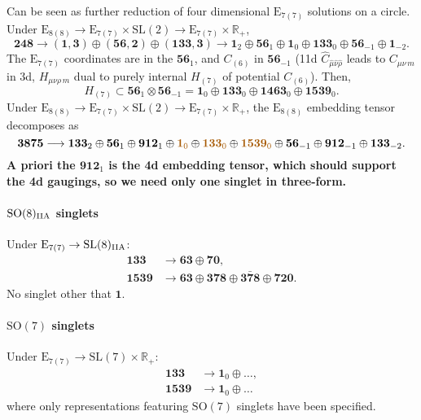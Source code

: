 \documentclass[11pt]{article}
\newcommand{\SO}{\ensuremath{\mathrm{SO}}\xspace}
\newcommand{\SL}{\ensuremath{\mathrm{SL}}\xspace}
\newcommand{\E}{\ensuremath{\mathrm{E}}\xspace}
\newcommand{\R}{\ensuremath{\mathbb{R}}\xspace}
\newcommand{\ce}[1]{\marginpar{\parbox{\marginparwidth}{\boldmath $\Longleftarrow$}}
{\boldmath\bfseries #1}}
\begin{document}
Can be seen as further reduction of four dimensional $\E_{7(7)}$ solutions on a circle. Under $\E_{8(8)}\rightarrow\E_{7(7)}\times\SL(2)\rightarrow\E_{7(7)}\times\R_{+}$,
\begin{equation}
  \bm{248} \longrightarrow (\bm{1},\bm{3}) \oplus (\bm{56},\bm{2}) \oplus (\bm{133},\bm{3})\longrightarrow \bm{1}_{2} \oplus \bm{56}_{1} \oplus \bm{1}_{0} \oplus \bm{133}_{0} \oplus \bm{56}_{-1} \oplus \bm{1}_{-2}.
\end{equation}
The $\E_{7(7)}$ coordinates are in the $\bm{56}_{1}$, and $C_{(6)}$ in $\bm{56}_{-1}$ (11d $\hat{C}_{\hat\mu\hat\nu\hat\rho}$ leads to $C_{\mu\nu\,m}$ in 3d, $H_{\mu\nu\rho\,m}$ dual to purely internal $H_{(7)}$ of potential $C_{(6)}$). Then,
\begin{equation}
    H_{(7)} \subset \bm{56}_{1} \otimes \bm{56}_{-1} = \bm{1}_{0} \oplus \bm{133}_{0} \oplus \bm{1463}_{0} \oplus \bm{1539}_{0}.
\end{equation}
Under $\E_{8(8)}\rightarrow\E_{7(7)}\times\SL(2)\rightarrow\E_{7(7)}\times\R_{+}$, the $\E_{8(8)}$ embedding tensor decomposes as
\begin{equation}
    \bm{3875} \longrightarrow \bm{133}_{2} \oplus \bm{56}_{1} \oplus \bm{912}_{1} \oplus {\color{mydarkorange}\bm{1}_{0}} \oplus {\color{mydarkorange}\bm{133}_{0}} \oplus {\color{mydarkorange}\bm{1539}_{0}} \oplus \bm{56}_{-1} \oplus \bm{912}_{-1} \oplus \bm{133}_{-2}.
\end{equation}
\ce{A priori the $\bm{912}_{1}$ is the 4d embedding tensor, which should support the 4d gaugings, so we need only one singlet in three-form.}

\paragraph{\boldmath $\SO(8)_{\rm IIA}$ singlets}
Under $\E_{7(7)}\rightarrow\SL(8)_{\rm IIA}$:
\begin{equation}
  \begin{aligned}
    \bm{133} & \longrightarrow \bm{63} \oplus \bm{70},\\
    \bm{1539} & \longrightarrow \bm{63} \oplus \bm{378} \oplus \bm{\bar{378}} \oplus \bm{720}.
  \end{aligned}
\end{equation}
No singlet other that $\bm{1}$.

\paragraph{\boldmath $\SO(7)$ singlets}
Under $\E_{7(7)}\rightarrow\SL(7)\times\R_{+}$:
\begin{equation}
  \begin{aligned}
    \bm{133} & \longrightarrow \bm{1}_{0} \oplus \ldots,\\
    \bm{1539} & \longrightarrow \bm{1}_{0} \oplus \ldots
  \end{aligned}
\end{equation}
where only representations featuring $\SO(7)$ singlets have been specified.
\end{document}

